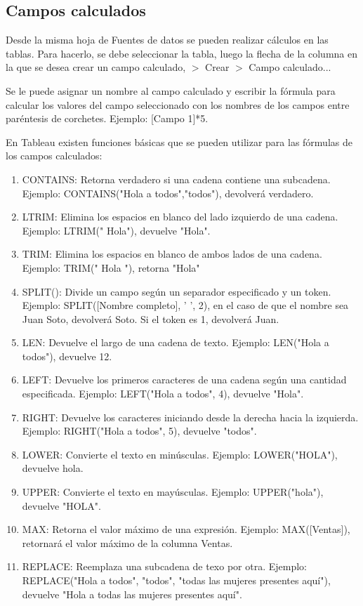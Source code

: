 \documentclass[a4paper, 12pt]{book}
\begin{document}
\subsection{Campos calculados}
Desde la misma hoja de Fuentes de datos se pueden realizar cálculos en las tablas. Para hacerlo, se debe seleccionar la tabla, luego la flecha de la columna en la que se desea crear un campo calculado, $>$ Crear $>$ Campo calculado...

Se le puede asignar un nombre al campo calculado y escribir la fórmula para calcular los valores del campo seleccionado con los nombres de los campos entre paréntesis de corchetes. Ejemplo: [Campo 1]*5.

En Tableau existen funciones básicas que se pueden utilizar para las fórmulas de los campos calculados:
\begin{enumerate}
	\item CONTAINS: Retorna verdadero si una cadena contiene una subcadena. Ejemplo: CONTAINS("Hola a todos","todos"), devolverá verdadero.
	\item LTRIM: Elimina los espacios en blanco del lado izquierdo de una cadena. Ejemplo: LTRIM("    Hola"), devuelve "Hola".
	\item TRIM: Elimina los espacios en blanco de ambos lados de una cadena. Ejemplo: TRIM("  Hola  "), retorna "Hola"
	\item SPLIT(): Divide un campo según un separador especificado y un token. Ejemplo: SPLIT([Nombre completo], ' ', 2), en el caso de que el nombre sea Juan Soto, devolverá Soto. Si el token es 1, devolverá Juan.
	\item LEN: Devuelve el largo de una cadena de texto. Ejemplo: LEN("Hola a todos"), devuelve 12.
	\item LEFT: Devuelve los primeros caracteres de una cadena según una cantidad especificada. Ejemplo: LEFT("Hola a todos", 4), devuelve "Hola".
	\item RIGHT: Devuelve los caracteres iniciando desde la derecha hacia la izquierda. Ejemplo: RIGHT("Hola a todos", 5), devuelve "todos".
	\item LOWER: Convierte el texto en minúsculas. Ejemplo: LOWER("HOLA"), devuelve hola.
	\item UPPER: Convierte el texto en mayúsculas. Ejemplo: UPPER("hola"), devuelve "HOLA".
	\item MAX: Retorna el valor máximo de una expresión. Ejemplo: MAX([Ventas]), retornará el valor máximo de la columna Ventas.
	\item REPLACE: Reemplaza una subcadena de texo por otra. Ejemplo: REPLACE("Hola a todos", "todos", "todas las mujeres presentes aquí"), devuelve "Hola a todas las mujeres presentes aquí".

\end{enumerate}
\end{document}
